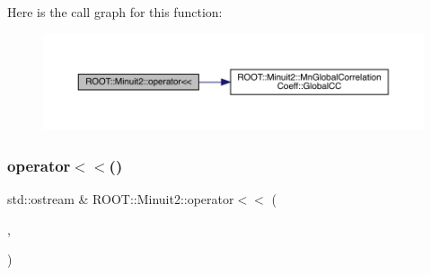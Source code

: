 Here is the call graph for this function\+:\nopagebreak
\begin{figure}[H]
\begin{center}
\leavevmode
\includegraphics[width=350pt]{d6/d3a/namespaceROOT_1_1Minuit2_ad8fa7aff1b1b2645f8b2a9c9a2231252_cgraph}
\end{center}
\end{figure}
\mbox{\label{namespaceROOT_1_1Minuit2_a30dd5b9978bba19603bb3fb0f7427ddc}} 
\subsubsection{\texorpdfstring{operator$<$$<$()}{operator<<()}\hspace{0.1cm}{\footnotesize\ttfamily [8/11]}}
{\footnotesize\ttfamily std\+::ostream \& R\+O\+O\+T\+::\+Minuit2\+::operator$<$$<$ (\begin{DoxyParamCaption}\item[{std\+::ostream \&}]{,  }\item[{const \mbox{\hyperlink{classROOT_1_1Minuit2_1_1MnUserParameterState}{Mn\+User\+Parameter\+State}} \&}]{ }\end{DoxyParamCaption})}

